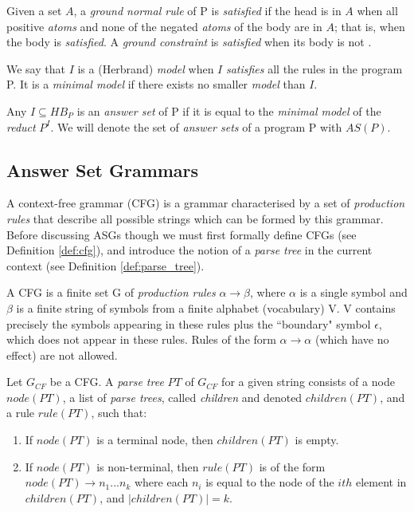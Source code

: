 \noindent
Given a set $A$, a \textit{ground normal rule} of P is \textit{satisfied} if the head is in $A$ when all positive \textit{atoms} and none of the negated \textit{atoms} of the body are in $A$; that is, when the body is \textit{satisfied}. A \textit{ground constraint} is \textit{satisfied} when its body is not \cite{law_representing_2019}.

\begin{definition}
We say that $I$ is a (Herbrand) \textit{model} when $I$ \textit{satisfies} all the rules in the program P. It is a \textit{minimal model} if there exists no smaller \textit{model} than $I$.
\end{definition}

\begin{definition}
\label{def:answer_set}
Any $I \subseteq HB_P$ is an \textit{answer set} of P if it is equal to the \textit{minimal model}  of the \textit{reduct} $P^I$. We will denote the set of \textit{answer sets} of a program P with $AS(P)$. 
\end{definition}

\subsection{Answer Set Grammars}

A context-free grammar (CFG) is a grammar characterised by a set of \textit{production rules} that describe all possible strings which can be formed by this grammar. Before discussing ASGs though we must first formally define CFGs (see Definition \ref{def:cfg}), and introduce the notion of a \textit{parse tree} in the current context (see Definition \ref{def:parse_tree}).

\begin{definition}
\label{def:cfg}
A CFG is a finite set G of \textit{production rules} $\alpha \to \beta$, where $\alpha$ is a single symbol and $\beta$ is a finite string of symbols from a finite alphabet (vocabulary) V. V contains precisely the symbols appearing in these rules plus the ``boundary" symbol $\epsilon$, which does not appear in these rules. Rules of the form $\alpha \to \alpha$ (which have no effect) are not allowed.
\end{definition}

\begin{definition}
\label{def:parse_tree}
Let $G_{CF}$ be a CFG. A \textit{parse tree} $PT$ of $G_{CF}$ for a given string consists of a node $node(PT)$, a list of \textit{parse trees}, called \textit{children} and denoted $children(PT)$, and a rule $rule(PT)$, such that:
\begin{enumerate}[nolistsep]
\item If $node(PT)$ is a terminal node, then $children(PT)$ is empty.
\item If $node(PT)$ is non-terminal, then $rule(PT)$ is of the form $node(PT) \to n_1 ... n_k$ where each $n_i$ is equal to the node of the $ith$ element in $children(PT)$, and $|children(PT)| = k$.
\end{enumerate}
\end{definition}

